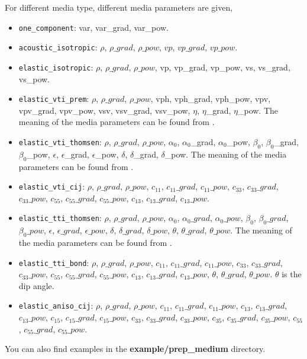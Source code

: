 \begin{itemize}
For different media type, different media parameters are given,
\begin{itemize}
  \item \texttt{one\_component}: var, var\_grad, var\_pow.

  \item \texttt{acoustic\_isotropic}: $\rho$, $\rho\_grad$, $\rho\_pow$, $vp$, $vp\_grad$, $vp\_pow$.

  \item \texttt{elastic\_isotropic}: $\rho$, $\rho\_grad$, $\rho\_pow$, vp, vp\_grad, vp\_pow, vs, vs\_grad, vs\_pow.

  \item \texttt{elastic\_vti\_prem}: $\rho$, $\rho\_grad$, $\rho\_pow$, vph, vph\_grad, vph\_pow, vpv, vpv\_grad, vpv\_pow, vsv, vsv\_grad, vsv\_pow, $\eta$, $\eta$\_grad, $\eta$\_pow. The meaning of the media parameters can be found from \citep{dziewonski1981preliminary}.

  \item \texttt{elastic\_vti\_thomsen}: $\rho$, $\rho\_grad$, $\rho\_pow$, $\alpha_0$, $\alpha_0$\_grad, $\alpha_0$\_pow, $\beta_0$, $\beta_0$\_grad, $\beta_0$\_pow, $\epsilon$, $\epsilon$\_grad, $\epsilon$\_pow, $\delta$, $\delta$\_grad, $\delta$\_pow. The meaning of the media parameters can be found from \citep{thomsen1986weak}.
  
  \item \texttt{elastic\_vti\_cij}: $\rho$, $\rho\_grad$, $\rho\_pow$, $c_{11}$, $c_{11}\_grad$, $c_{11}\_pow$, $c_{33}$, $c_{33}\_grad$, $c_{33}\_pow$, $c_{55}$, $c_{55}\_grad$, $c_{55}\_pow$, $c_{13}$, $c_{13}\_grad$, $c_{13}\_pow$. 

  \item \texttt{elastic\_tti\_thomsen}: $\rho$, $\rho\_grad$, $\rho\_pow$, $\alpha_0$, $\alpha_0\_grad$, $\alpha_0\_pow$, $\beta_0$, $\beta_0\_grad$, $\beta_0\_pow$, $\epsilon$, $\epsilon\_grad$, $\epsilon\_pow$, $\delta$, $\delta\_grad$, $\delta\_pow$, $\theta$, $\theta\_grad$, $\theta\_pow$. The meaning of the media parameters can be found from \citep{thomsen1986weak}.

  \item \texttt{elastic\_tti\_bond}: $\rho$, $\rho\_grad$, $\rho\_pow$, $c_{11}$, $c_{11}\_grad$, $c_{11}\_pow$, $c_{33}$, $c_{33}\_grad$, $c_{33}\_pow$, $c_{55}$, $c_{55}\_grad$, $c_{55}\_pow$, $c_{13}$, $c_{13}\_grad$, $c_{13}\_pow$, $\theta$, $\theta\_grad$, $\theta\_pow$. $\theta$ is the dip angle.

  \item \texttt{elastic\_aniso\_cij}: $\rho$, $\rho\_grad$, $\rho\_pow$, $c_{11}$, $c_{11}\_grad$, $c_{11}\_pow$, $c_{13}$, $c_{13}\_grad$, $c_{13}\_pow$, $c_{15}$, $c_{15}\_grad$, $c_{15}\_pow$, $c_{33}$, $c_{33}\_grad$, $c_{33}\_pow$, $c_{35}$, $c_{35}\_grad$, $c_{35}\_pow$, $c_{55}$, $c_{55}\_grad$, $c_{55}\_pow$.
\end{itemize}

\end{itemize}
You can also find examples in the \textbf{example/prep\_medium} directory.

